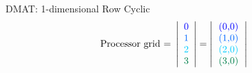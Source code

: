 \begin{frame}
\begin{exampleblock}{DMAT: 1-dimensional Row Cyclic}
\begin{align*}
\text{Processor grid = }\left|
      \begin{array}{l}
      \color{g11}0 \\
      \color{g12}1 \\
      \color{g13}2 \\
      \color{g21}3
      \end{array}
\right| &= 
\left|
      \begin{tabular}{lll}
      \color{g11}(0,0) \\
      \color{g12}(1,0) \\
      \color{g13}(2,0) \\
      \color{g21}(3,0) 
      \end{tabular}
\right|
\end{align*}
\end{exampleblock}
\end{frame}



